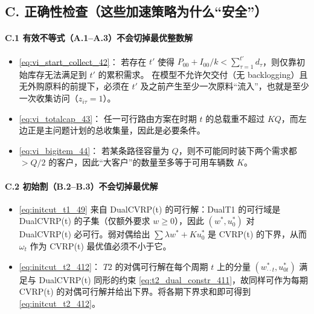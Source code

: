 \documentclass{article}
\begin{document}
\subsection{C. 正确性检查（这些加速策略为什么“安全”）}

\paragraph{C.1 有效不等式（A.1--A.3）不会切掉最优整数解}
\begin{itemize}[leftmargin=2em]
  \item \eqref{eq:vi_start_collect_42}：
  若存在 $t'$ 使得 $P_{00}+I_{00}/k < \sum_{\tau=1}^{t'} d_\tau$，则仅靠初始库存无法满足到 $t'$ 的累积需求。
  在模型不允许欠交付（无 backlogging）且无外购原料的前提下，必须在 $t'$ 及之前产生至少一次原料“流入”，也就是至少一次收集访问（$z_{i\tau}=1$）。
  \item \eqref{eq:vi_totalcap_43}：
  任一可行路由方案在时期 $t$ 的总载重不超过 $KQ$，而左边正是主问题计划的总收集量，因此是必要条件。
  \item \eqref{eq:vi_bigitem_44}：
  若某条路径容量为 $Q$，则不可能同时装下两个需求都 $>Q/2$ 的客户，因此“大客户”的数量至多等于可用车辆数 $K$。
\end{itemize}

\paragraph{C.2 初始割（B.2--B.3）不会切掉最优解}
\begin{itemize}[leftmargin=2em]
  \item \eqref{eq:initcut_t1_49} 来自 DualCVRP(t) 的可行解：DualT1 的可行域是 DualCVRP(t) 的子集（仅额外要求 $w\ge0$），因此 $(w^*,u_0^*)$ 对 DualCVRP(t) 必可行。弱对偶给出 $\sum \lambda w^*+K u_0^*$ 是 CVRP(t) 的下界，从而 $\omega_t$ 作为 CVRP(t) 最优值必须不小于它。
  \item \eqref{eq:initcut_t2_412}：
  $T2$ 的对偶可行解在每个周期 $t$ 上的分量 $(w^*_{\cdot\cdot t},u^*_{0t})$ 满足与 DualCVRP(t) 同形的约束 \eqref{eq:t2_dual_constr_411}，故同样可作为每期 CVRP(t) 的对偶可行解并给出下界。将各期下界求和即可得到 \eqref{eq:initcut_t2_412}。
\end{itemize}

\end{document}
